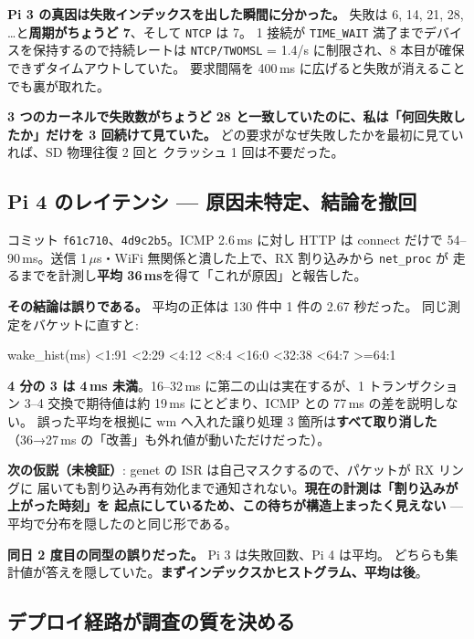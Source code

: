 \documentclass[a4paper,11pt]{ltjsarticle}
\begin{document}
\textbf{Pi 3 の真因は失敗インデックスを出した瞬間に分かった。}
失敗は 6, 14, 21, 28, \dots と\textbf{周期がちょうど 7}、そして \texttt{NTCP} は 7。
1 接続が \texttt{TIME\_WAIT} 満了までデバイスを保持するので持続レートは
\texttt{NTCP/TWOMSL} = 1.4/s に制限され、8 本目が確保できずタイムアウトしていた。
要求間隔を 400\,ms に広げると失敗が消えることでも裏が取れた。

\textbf{3 つのカーネルで失敗数がちょうど 28 と一致していたのに、私は「何回失敗したか」だけを
3 回続けて見ていた。} どの要求がなぜ失敗したかを最初に見ていれば、SD 物理往復 2 回と
クラッシュ 1 回は不要だった。

\subsection{Pi 4 のレイテンシ --- 原因未特定、結論を撤回}

コミット \texttt{f61c710}、\texttt{4d9c2b5}。ICMP 2.6\,ms に対し HTTP は connect だけで
54--90\,ms。送信 1\,$\mu$s・WiFi 無関係と潰した上で、RX 割り込みから \texttt{net\_proc} が
走るまでを計測し\textbf{平均 36\,ms}を得て「これが原因」と報告した。

\textbf{その結論は誤りである。} 平均の正体は 130 件中 1 件の 2.67 秒だった。
同じ測定をバケットに直すと:

\begin{code}
wake_hist(ms) <1:91  <2:29  <4:12  <8:4  <16:0  <32:38  <64:7  >=64:1
\end{code}

\textbf{4 分の 3 は 4\,ms 未満}。16--32\,ms に第二の山は実在するが、1 トランザクション
3--4 交換で期待値は約 19\,ms にとどまり、ICMP との 77\,ms の差を説明しない。
誤った平均を根拠に wm へ入れた譲り処理 3 箇所は\textbf{すべて取り消した}
（36→27\,ms の「改善」も外れ値が動いただけだった）。

\textbf{次の仮説（未検証）}: genet の ISR は自己マスクするので、パケットが RX リングに
届いても割り込み再有効化まで通知されない。\textbf{現在の計測は「割り込みが上がった時刻」を
起点にしているため、この待ちが構造上まったく見えない} --- 平均で分布を隠したのと同じ形である。

\textbf{同日 2 度目の同型の誤りだった。} Pi 3 は失敗回数、Pi 4 は平均。
どちらも集計値が答えを隠していた。\textbf{まずインデックスかヒストグラム、平均は後}。

\subsection{デプロイ経路が調査の質を決める}
\end{document}

